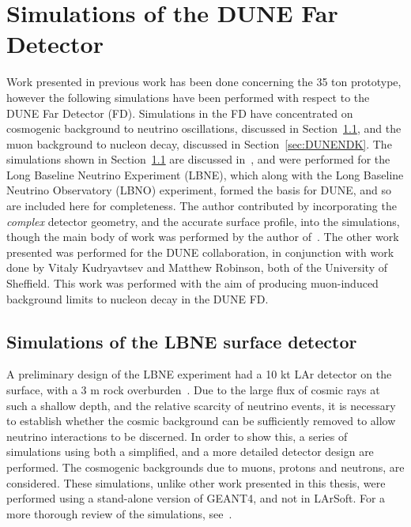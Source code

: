 

\chapter{Simulations of the DUNE Far Detector} \label{chap:FDSims} %
\graphicspath{{FarDetectorSimulations/Figs/Raster/}{FarDetectorSimulations/Figs/PDF/}{FarDetectorSimulations/Figs/Vector/}}

Work presented in previous work has been done concerning the 35 ton prototype, however the following simulations have been performed with respect to the DUNE Far Detector (FD). Simulations in the FD have concentrated on cosmogenic background to neutrino oscillations, discussed in Section~\ref{sec:LBNESurf}, and the muon background to nucleon decay, discussed in Section~\ref{sec:DUNENDK}. The simulations shown in Section~\ref{sec:LBNESurf} are discussed in~\citep{MartinsThesis}, and were performed for the Long Baseline Neutrino Experiment (LBNE), which along with the Long Baseline Neutrino Observatory (LBNO) experiment, formed the basis for DUNE, and so are included here for completeness. The author contributed by incorporating the \emph{complex} detector geometry, and the accurate surface profile, into the simulations, though the main body of work was performed by the author of~\citep{MartinsThesis}. The other work presented was performed for the DUNE collaboration, in conjunction with work done by Vitaly Kudryavtsev and Matthew Robinson, both of the University of Sheffield. This work was performed with the aim of producing muon-induced background limits to nucleon decay in the DUNE FD. \\

\section{Simulations of the LBNE surface detector} \label{sec:LBNESurf} %
A preliminary design of the LBNE experiment had a 10 kt LAr detector on the surface, with a 3 m rock overburden~\citep{LBNE6493}. Due to the large flux of cosmic rays at such a shallow depth, and the relative scarcity of neutrino events, it is necessary to establish whether the cosmic background can be sufficiently removed to allow neutrino interactions to be discerned. In order to show this, a series of simulations using both a simplified, and a more detailed detector design are performed. The cosmogenic backgrounds due to muons, protons and neutrons, are considered. These simulations, unlike other work presented in this thesis, were performed using a stand-alone version of GEANT4, and not in LArSoft. For a more thorough review of the simulations, see~\citep{MartinsThesis}. \\

